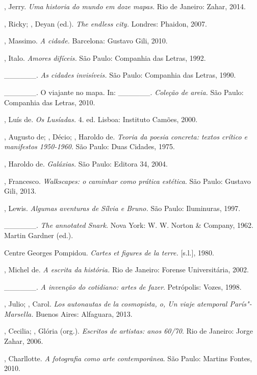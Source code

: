 \begin{Parskip}
, Jerry. \emph{Uma historia do mundo em doze mapas.} Rio de
Janeiro: Zahar, 2014.

, Ricky; , Deyan (ed.). \emph{The endless city.} Londres:
Phaidon, 2007.

, Massimo. \emph{A cidade.} Barcelona: Gustavo Gili, 2010.

, Italo. \emph{Amores difíceis.} São Paulo: Companhia das
Letras, 1992.

\_\_\_\_\_\_. \emph{As cidades invisíveis.} São Paulo: Companhia
das Letras, 1990.

\_\_\_\_\_\_. O viajante no mapa. In: \_\_\_\_\_\_.
\emph{Coleção de areia.} São Paulo: Companhia das Letras, 2010.

, Luís de. \emph{Os Lusíadas.} 4. ed. Lisboa: Instituto Camões,
2000.

, Augusto de; , Décio; , Haroldo de. \emph{Teoria da poesia concreta: textos crítico e manifestos 1950-1960}. São Paulo:
Duas Cidades, 1975.

, Haroldo de. \emph{Galáxias.} São Paulo: Editora 34, 2004.

, Francesco. \emph{Walkscapes: o caminhar como prática
estética}. São Paulo: Gustavo Gili, 2013.

, Lewis. \emph{Algumas aventuras de Sílvia e Bruno.} São Paulo:
Iluminuras, 1997.

\_\_\_\_\_\_. \emph{The annotated Snark.} Nova York: W. W. Norton
\& Company, 1962. Martin Gardner (ed.).

Centre Georges Pompidou. \emph{Cartes et figures de la terre.}
{[}s.l.{]}, 1980.

, Michel de. \emph{A escrita da história.} Rio de Janeiro: Forense Universitária, 2002.

\_\_\_\_\_\_. \emph{A invenção do cotidiano: artes de fazer}.
Petrópolis: Vozes, 1998.

, Julio; , Carol. \emph{Los autonautas de la cosmopista,
o, Un viaje atemporal París"-Marsella.} Buenos Aires: Alfaguara, 2013.

, Cecilia; , Glória (org.). \emph{Escritos de artistas:
anos 60/70}. Rio de Janeiro: Jorge Zahar, 2006.

, Charllotte. \emph{A fotografia como arte contemporânea}. São
Paulo: Martins Fontes, 2010.


\end{Parskip}
